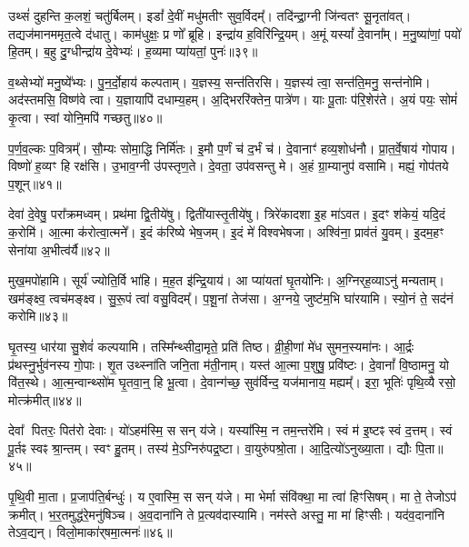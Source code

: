 उथ्सं॑ दुहन्ति क॒लशं॒ चतु॑र्बिलम्।
इडां᳚ दे॒वीं मधु॑मतीꣳ सुव॒र्विदम्᳚।
तदि॑न्द्रा॒ग्नी जि॑न्वतꣳ सू॒नृता॑वत्।
तद्यज॑मान\-ममृत॒त्वे द॑धातु।
काम॑धुक्षः॒ प्र णो᳚ ब्रूहि।
इन्द्रा॑य ह॒विरि॑न्द्रि॒यम्।
अ॒मूं यस्यां᳚ दे॒वाना᳚म्।
म॒नु॒ष्या॑णां॒ पयो॑ हि॒तम्।
ब॒हु दु॒ग्धीन्द्रा॑य दे॒वेभ्यः॑।
ह॒व्यमा प्या॑यतां॒ पुनः॑॥३९॥

व॒थ्सेभ्यो॑ मनु॒ष्ये᳚भ्यः।
पु॒न॒र्दो॒हाय॑ कल्पताम्।
य॒ज्ञस्य॒ सन्त॑तिरसि।
य॒ज्ञस्य॑ त्वा॒ सन्त॑ति॒मनु॒ सन्त॑नोमि।
अद॑स्तमसि॒ विष्ण॑वे त्वा।
य॒ज्ञायापि॑ दधाम्य॒हम्।
अ॒द्भिररि॑क्तेन॒ पात्रे॑ण।
याः पू॒ताः प॑रि॒शेर॑ते।
अ॒यं पयः॒ सोमं॑ कृ॒त्वा।
स्वां योनि॒मपि॑ गच्छतु॥४०॥

प॒र्ण॒व॒ल्कः प॒वित्रम्᳚।
सौ॒म्यः सोमा॒द्धि निर्मि॑तः।
इ॒मौ प॒र्णं च॑ द॒र्भं च॑।
दे॒वानाꣳ॑ हव्य॒शोध॑नौ।
प्रा॒त॒र्वे॒षाय॑ गोपाय।
विष्णो॑ ह॒व्यꣳ हि रक्ष॑सि।
उ॒भाव॒ग्नी उ॑पस्तृण॒ते।
दे॒वता॒ उप॑वसन्तु मे।
अ॒हं ग्रा॒म्यानुप॑ वसामि।
मह्यं॒ गोप॑तये प॒शून्॥४१॥\anuvakamend[आभृ॑त इ॒मं गृ॑ह्णामि॒ पूर्व॒स्ताः पूर्वः॒ परि॑गृह्णामि सभापा॒ला इन्द्र॑ज्येष्ठेभ्य॒ आदि॑त्य व्रतपते सुस॒म्भृता॑ मे स॒ह पु॑नातु गहि नो वि॒श्वरू॑पा दधातु॒ पुन॑र्गच्छतु प॒शून् (याः पु॒रस्ता॑दि॒मामूर्ज॑मि॒ह प्र॒जा इ॒ह प॒शवो॒ऽयं पि॑तृ॒णाम॒ग्निः।)]

देवा॑ दे॒वेषु॒ परा᳚क्रमध्वम्।
प्रथ॑मा द्वि॒तीये॑षु।
द्विती॑यास्तृ॒तीये॑षु।
त्रिरे॑कादशा इ॒ह मा॑ऽवत।
इ॒दꣳ श॑केयं॒ यदि॒दं क॒रोमि॑।
आ॒त्मा क॑रोत्वा॒त्मने᳚।
इ॒दं क॑रिष्ये भेष॒जम्।
इ॒दं मे॑ विश्वभेषजा।
अश्वि॑ना॒ प्राव॑तं यु॒वम्।
इ॒दम॒हꣳ सेना॑या अ॒भीत्व॑र्यै॥४२॥

मुख॒मपो॑हामि।
सूर्य॑ ज्योति॒र्वि भा॑हि।
म॒ह॒त इ॑न्द्रि॒याय॑।
आ प्या॑यतां घृ॒तयो॑निः।
अ॒ग्निर्‌\mbox{}ह॒व्याऽनु॑ मन्यताम्।
खम॑ङ्क्ष्व॒ त्वच॑मङ्क्ष्व।
सु॒रू॒पं त्वा॑ वसु॒विदम्᳚।
प॒शू॒नां तेज॑सा।
अ॒ग्नये॒ जुष्ट॑म॒भि घा॑रयामि।
स्यो॒नं ते॒ सद॑नं करोमि॥४३॥

घृ॒तस्य॒ धार॑या सु॒शेवं॑ कल्पयामि।
तस्मि᳚न्थ्सीदा॒मृते॒ प्रति॑ तिष्ठ।
व्री॒ही॒णां मे॑ध सुमन॒स्यमा॑नः।
आ॒र्द्रः प्र॑थस्नु॒र्भुव॑नस्य गो॒पाः।
शृ॒त उथ्स्ना॑ति जनि॒ता म॑ती॒नाम्।
यस्त॑ आ॒त्मा प॒शुषु॒ प्रवि॑ष्टः।
दे॒वानां᳚ वि॒ष्ठामनु॒ यो वि॑त॒स्थे।
आ॒त्म॒न्वान्थ्सो॑म घृ॒तवा॒न्॒ हि भू॒त्वा।
दे॒वान्ग॑च्छ॒ सुव॑र्विन्द॒ यज॑मानाय॒ मह्यम्᳚।
इरा॒ भूतिः॑ पृथि॒व्यै रसो॒ मोत्क्र॑मीत्॥४४॥

देवा᳚ पितरः॒ पित॑रो देवाः।
यो॑ऽहम॑स्मि॒ स सन् य॑जे।
यस्या᳚स्मि॒ न तम॒न्तरे॑मि।
स्वं म॑ इ॒ष्टꣴ स्वं द॒त्तम्।
स्वं पू॒र्तꣴ स्वꣴ श्रा॒न्तम्।
स्वꣳ हु॒तम्।
तस्य॑ मे॒\-ऽग्निरु॑पद्र॒ष्टा।
वा॒युरु॑पश्रो॒ता।
आ॒दि॒त्यो॑\-ऽनुख्या॒ता।
द्यौः पि॒ता॥४५॥

पृ॒थि॒वी मा॒ता।
प्र॒जाप॑ति॒र्बन्धुः॑।
य ए॒वास्मि॒ स सन् य॑जे।
मा भेर्मा संवि॑क्था॒ मा त्वा॑ हिꣳसिषम्।
मा ते॒ तेजोऽप॑ क्रमीत्।
भ॒र॒तमुद्ध॑रे॒मनु॑षिञ्च।
अ॒व॒दाना॑नि ते प्र॒त्यव॑दास्यामि।
नम॑स्ते अस्तु॒ मा मा॑ हिꣳसीः।
यद॑व॒दाना॑नि तेऽव॒द्यन्।
विलो॒माका॑र्‌\mbox{}षमा॒त्मनः॑॥४६॥

